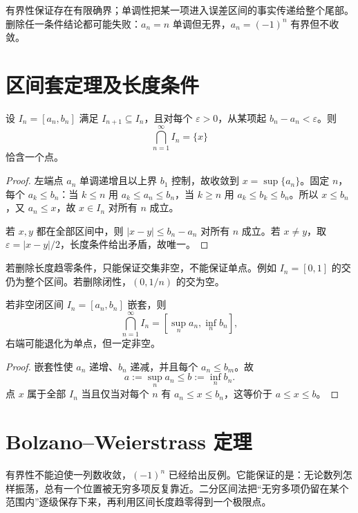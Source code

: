 \begin{insightbox}[两个假设各自做了什么]
有界性保证存在有限确界；单调性把某一项进入误差区间的事实传递给整个尾部。删除任一条件结论都可能失败：\(a_n=n\) 单调但无界，\(a_n=(-1)^n\) 有界但不收敛。
\end{insightbox}

\section{区间套定理及长度条件}


\begin{theorem}[区间套定理]
设 \(I_n=[a_n,b_n]\) 满足 \(I_{n+1}\subseteq I_n\)，且对每个 \(\varepsilon>0\)，从某项起 \(b_n-a_n<\varepsilon\)。则
\[
 \bigcap_{n=1}^{\infty}I_n=\{x\}
\]
恰含一个点。
\end{theorem}

\begin{proof}
左端点 \(a_n\) 单调递增且以上界 \(b_1\) 控制，故收敛到 \(x=\sup\{a_n\}\)。固定 \(n\)，每个 \(a_k\le b_n\)：当 \(k\le n\) 用 \(a_k\le a_n\le b_n\)，当 \(k\ge n\) 用 \(a_k\le b_k\le b_n\)。所以 \(x\le b_n\)，又 \(a_n\le x\)，故 \(x\in I_n\) 对所有 \(n\) 成立。

若 \(x,y\) 都在全部区间中，则 \(|x-y|\le b_n-a_n\) 对所有 \(n\) 成立。若 \(x\ne y\)，取 \(\varepsilon=|x-y|/2\)，长度条件给出矛盾，故唯一。
\end{proof}

若删除长度趋零条件，只能保证交集非空，不能保证单点。例如 \(I_n=[0,1]\) 的交仍为整个区间。若删除闭性，\((0,1/n)\) 的交为空。

\begin{proposition}[不要求长度趋零的闭区间套]
若非空闭区间 \(I_n=[a_n,b_n]\) 嵌套，则
\[
 \bigcap_{n=1}^{\infty}I_n
 =
 \left[\sup_n a_n,\inf_n b_n\right],
\]
右端可能退化为单点，但一定非空。
\end{proposition}

\begin{proof}
嵌套性使 \(a_n\) 递增、\(b_n\) 递减，并且每个 \(a_n\le b_m\)。故
\[
 a:=\sup_n a_n\le b:=\inf_n b_n.
\]
点 \(x\) 属于全部 \(I_n\) 当且仅当对每个 \(n\) 有 \(a_n\le x\le b_n\)，这等价于 \(a\le x\le b\)。
\end{proof}

\section{Bolzano--Weierstrass 定理}

有界性不能迫使一列数收敛，\((-1)^n\) 已经给出反例。它能保证的是：无论数列怎样振荡，总有一个位置被无穷多项反复靠近。二分区间法把“无穷多项仍留在某个范围内”逐级保存下来，再利用区间长度趋零得到一个极限点。


